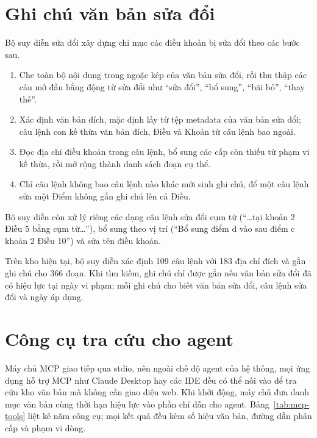 \section{Ghi chú văn bản sửa đổi}
\label{sec:cd-suadoi}

Bộ suy diễn sửa đổi xây dựng chỉ mục các điều khoản bị sửa đổi theo các bước sau.

\begin{enumerate}
    \item Che toàn bộ nội dung trong ngoặc kép của văn bản sửa đổi, rồi thu thập các câu mở đầu bằng động từ sửa đổi như ``sửa đổi'', ``bổ sung'', ``bãi bỏ'', ``thay thế''.
    \item Xác định văn bản đích, mặc định lấy từ tệp metadata của văn bản sửa đổi; câu lệnh con kế thừa văn bản đích, Điều và Khoản từ câu lệnh bao ngoài.
    \item Đọc địa chỉ điều khoản trong câu lệnh, bổ sung các cấp còn thiếu từ phạm vi kế thừa, rồi mở rộng thành danh sách đoạn cụ thể.
    \item Chỉ câu lệnh không bao câu lệnh nào khác mới sinh ghi chú, để một câu lệnh sửa một Điểm không gắn ghi chú lên cả Điều.
\end{enumerate}

Bộ suy diễn còn xử lý riêng các dạng câu lệnh sửa đổi cụm từ (``\ldots tại khoản 2 Điều 5 bằng cụm từ\ldots''), bổ sung theo vị trí (``Bổ sung điểm d vào sau điểm c khoản 2 Điều 10'') và sửa tên điều khoản.

Trên kho hiện tại, bộ suy diễn xác định 109 câu lệnh với 183 địa chỉ đích và gắn ghi chú cho 366 đoạn. Khi tìm kiếm, ghi chú chỉ được gắn nếu văn bản sửa đổi đã có hiệu lực tại ngày vi phạm; mỗi ghi chú cho biết văn bản sửa đổi, câu lệnh sửa đổi và ngày áp dụng.

\section{Công cụ tra cứu cho agent}
\label{sec:cd-mcp}

Máy chủ MCP giao tiếp qua stdio, nên ngoài chế độ agent của hệ thống, mọi ứng dụng hỗ trợ MCP như Claude Desktop hay các IDE đều có thể nối vào để tra cứu kho văn bản mà không cần giao diện web. Khi khởi động, máy chủ đưa danh mục văn bản cùng thời hạn hiệu lực vào phần chỉ dẫn cho agent. Bảng~\ref{tab:mcp-tools} liệt kê năm công cụ; mọi kết quả đều kèm số hiệu văn bản, đường dẫn phân cấp và phạm vi dòng.

